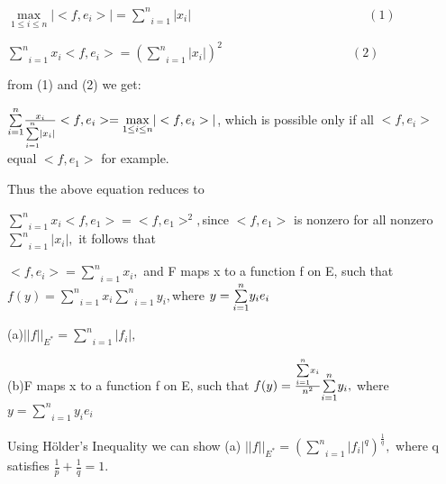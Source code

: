 \documentclass{article}
\begin{document}
$\underset{1\leq i\leq n}{\max }|<f,e_{i}>|=\underset{i=1}{\overset{n}{\sum }%
}|x_{i}|\qquad \qquad \qquad \qquad \qquad \qquad \qquad (1)$

$\underset{i=1}{\overset{n}{\sum }}x_{i}<f,e_{i}>=(\underset{i=1}{\overset{n}%
{\sum }}|x_{i}|)^{2}\qquad \qquad \qquad \qquad \qquad \ (2)$

from (1) and (2) we get:

$\underset{i=1}{\overset{n}{\sum }}\frac{x_{i}}{\underset{i=1}{\overset{n}{%
\sum }}|x_{i}|}<f,e_{i}>=\underset{1\leq i\leq n}{\max }|<f,e_{i}>|$, which
is possible only if all $<f,e_{i}>$ equal $<f,e_{1}>$ for example.

Thus the above equation reduces to

$\underset{i=1}{\overset{n}{\sum }}x_{i}<f,e_{1}>=<f,e_{1}>^{2},$since $%
<f,e_{1}>$ is nonzero for all nonzero $\underset{i=1}{\overset{n}{\sum }}%
|x_{i}|,$ it follows that

$<f,e_{i}>=\underset{i=1}{\overset{n}{\sum }}x_{i},$ and F maps x to a
function f on E, such that $f(y)=\underset{i=1}{\overset{n}{\sum }}x_{i}%
\underset{i=1}{\overset{n}{\sum }}y_{i},$where $y=\underset{i=1}{\overset{n}{%
\sum }}y_{i}e_{i}$


(a)$||f||_{E^{\ast }}=\underset{i=1}{\overset{n}{\sum }}|f_{i}|,$

(b)F maps x to a function f on E, such that $f(y)=\frac{\underset{i=1}{%
\overset{n}{\sum }}x_{i}}{n^{2}}\underset{i=1}{\overset{n}{\sum }}y_{i},$%
where $y=\underset{i=1}{\overset{n}{\sum }}y_{i}e_{i}$


Using H\"{o}lder's Inequality we can show (a) $||f||_{E^{\ast }}=\left( 
\underset{i=1}{\overset{n}{\sum }}|f_{i}|^{q}\right) ^{\frac{1}{q}},$ where
q satisfies $\frac{1}{p}+\frac{1}{q}=1.$
\end{document}
